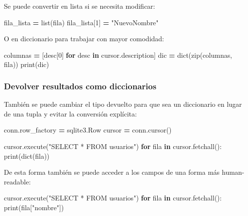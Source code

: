 \documentclass[
]{book}
\newenvironment{Shaded}{\begin{snugshade}}{\end{snugshade}}
\newcommand{\BuiltInTok}[1]{#1}
\newcommand{\ControlFlowTok}[1]{\textcolor[rgb]{0.13,0.29,0.53}{\textbf{#1}}}
\newcommand{\DecValTok}[1]{\textcolor[rgb]{0.00,0.00,0.81}{#1}}
\newcommand{\KeywordTok}[1]{\textcolor[rgb]{0.13,0.29,0.53}{\textbf{#1}}}
\newcommand{\NormalTok}[1]{#1}
\newcommand{\OperatorTok}[1]{\textcolor[rgb]{0.81,0.36,0.00}{\textbf{#1}}}
\newcommand{\StringTok}[1]{\textcolor[rgb]{0.31,0.60,0.02}{#1}}
\theoremstyle{break}
\theoremstyle{nonumberplain}
\begin{document}
Se puede convertir en lista si se necesita modificar:

\begin{Shaded}
\begin{Highlighting}[]
\NormalTok{fila\_lista }\OperatorTok{=} \BuiltInTok{list}\NormalTok{(fila)}
\NormalTok{fila\_lista[}\DecValTok{1}\NormalTok{] }\OperatorTok{=} \StringTok{"NuevoNombre"}
\end{Highlighting}
\end{Shaded}

O en diccionario para trabajar con mayor comodidad:

\begin{Shaded}
\begin{Highlighting}[]
\NormalTok{columnas }\OperatorTok{=}\NormalTok{ [desc[}\DecValTok{0}\NormalTok{] }\ControlFlowTok{for}\NormalTok{ desc }\KeywordTok{in}\NormalTok{ cursor.description]}
\NormalTok{dic }\OperatorTok{=} \BuiltInTok{dict}\NormalTok{(}\BuiltInTok{zip}\NormalTok{(columnas, fila))}
\BuiltInTok{print}\NormalTok{(dic)}
\end{Highlighting}
\end{Shaded}

\subsubsection{Devolver resultados como diccionarios}\label{devolver-resultados-como-diccionarios}

También se puede cambiar el tipo devuelto para que sea un diccionario en lugar de una tupla y evitar la conversión explícita:

\begin{Shaded}
\begin{Highlighting}[]
\NormalTok{conn.row\_factory }\OperatorTok{=}\NormalTok{ sqlite3.Row}
\NormalTok{cursor }\OperatorTok{=}\NormalTok{ conn.cursor()}

\NormalTok{cursor.execute(}\StringTok{"SELECT * FROM usuarios"}\NormalTok{)}
\ControlFlowTok{for}\NormalTok{ fila }\KeywordTok{in}\NormalTok{ cursor.fetchall():}
    \BuiltInTok{print}\NormalTok{(}\BuiltInTok{dict}\NormalTok{(fila))}
\end{Highlighting}
\end{Shaded}

De esta forma también se puede acceder a los campos de una forma más human-readable:

\begin{Shaded}
\begin{Highlighting}[]
\NormalTok{cursor.execute(}\StringTok{"SELECT * FROM usuarios"}\NormalTok{)}
\ControlFlowTok{for}\NormalTok{ fila }\KeywordTok{in}\NormalTok{ cursor.fetchall():}
    \BuiltInTok{print}\NormalTok{(fila[}\StringTok{"nombre"}\NormalTok{])}
\end{Highlighting}
\end{Shaded}
\end{document}
